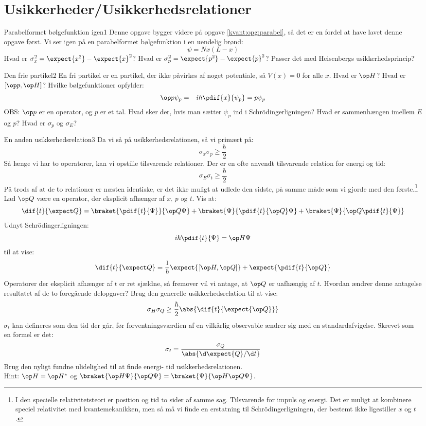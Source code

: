 \section*{Usikkerheder/Usikkerhedsrelationer}
\begin{opgave}{Parabelformet bølgefunktion igen}{1}
Denne opgave bygger videre på opgave \ref{kvant:opg:parabel}, så det er en fordel at have lavet denne opgave først. Vi ser igen på en parabelformet bølgefunktion i en uendelig brønd:
$$
\psi=Nx(L-x)
$$
\opg Hvad er $\sigma_x^2 = \expect{x^2}-\expect{x}^2$?
\opg Hvad er $\sigma_p^2 = \expect{p^2}-\expect{p}^2$?
\opg Passer det med Heisenbergs usikkerhedsprincip?
\end{opgave}
%
\begin{opgave}{Den frie partikel}{2}
En fri partikel er en partikel, der ikke påvirkes af noget potentiale, så $V(x)=0$ for alle $x$.
\opg Hvad er $\op H$?
\opg Hvad er $[\op p,\op H]$?
\opg Hvilke bølgefunktioner opfylder: 
$$
\op p \psi_p = -i\hbar\pdif{x}{\psi_p} = p\psi_p
$$
OBS: $\op p$ er en operator, og $p$ er et tal.
\opg Hvad sker der, hvis man sætter $\psi_p$ ind i Schrödingerligningen?
\opg Hvad er sammenhængen imellem $E$og $p$?
\opg Hvad er $\sigma_p$ og $\sigma_E$?
\end{opgave}
%
\begin{opgave}{En anden usikkerhedsrelation}{3}
Da vi så på usikkerhedsrelationen, så vi primært på:
$$
\sigma_x\sigma_p \geq \frac{\hbar}{2}
$$
Så længe vi har to operatorer, kan vi opstille tilsvarende relationer.
Der er en ofte anvendt tilsvarende relation for energi og tid:
$$
\sigma_E\sigma_t \geq \frac{\hbar}{2}
$$
På trods af at de to relationer er næsten identiske, er det ikke muligt at udlede den sidste, på samme måde som vi gjorde med den første.\footnote{I den specielle relativitetsteori er position og tid to sider af samme sag. Tilsvarende for impuls og energi. Det er muligt at kombinere speciel relativitet med kvantemekanikken, men så må vi finde en erstatning til Schrödingerligningen, der bestemt ikke ligestiller $x$ og $t$.}\\
Lad $\op Q$ være en operator, der eksplicit afhænger af $x$, $p$ og $t$.
\opg Vis at:
$$
\dif{t}{\expect Q} = \braket{\pdif{t}{\Psi}}{\op Q\Psi}+\braket{\Psi}{\pdif{t}{\op Q}\Psi}+\braket{\Psi}{\op Q\pdif{t}{\Psi}}
$$
\opg Udnyt Schrödingerligningen:
$$
i\hbar\pdif{t}{\Psi} = \op H\Psi
$$
til at vise:
$$
\dif{t}{\expect Q} = \frac{1}{\hbar}\expect{[\op H,\op Q]}+\expect{\pdif{t}{{\op Q}}}
$$
Operatorer der eksplicit afhænger af $t$ er ret sjældne, så fremover vil vi antage, at $\op Q$ er uafhængig af $t$.
\opg Hvordan ændrer denne antagelse resultatet af de to foregående delopgaver?
\opg Brug den generelle usikkerhedsrelation til at vise:
$$
\sigma_H\sigma_Q \geq \frac{\hbar}{2}\abs{\dif{t}{\expect{\op Q}}}
$$
$\sigma_t$ kan defineres som den tid der går, før forventningsværdien af en vilkårlig observable ændrer sig med en standardafvigelse. Skrevet som  en formel er det:
$$
\sigma_t = \frac{\sigma_Q}{\abs{\d \expect{Q}/\d t}}
$$
\opg Brug den nyligt fundne ulidelighed til at finde energi- tid usikkerhedsrelationen.\\
Hint: $\op H=\op H^*$ og $\braket{\op H\Psi}{\op Q\Psi}=\braket{\Psi}{\op H\op Q \Psi}$.
\end{opgave}